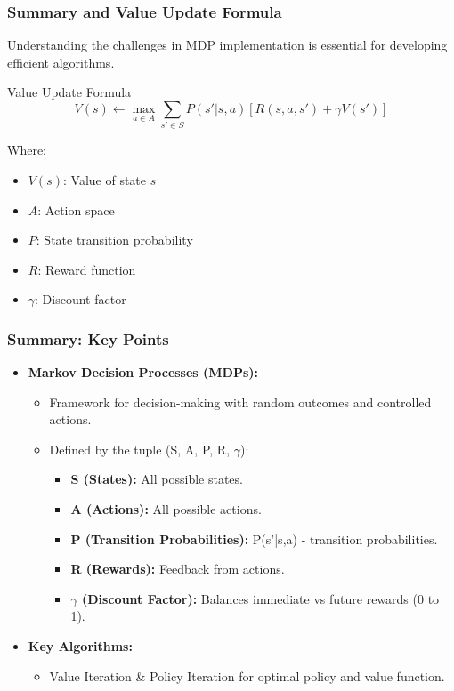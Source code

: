 \documentclass{beamer}
\begin{document}
\begin{frame}[fragile]
    \frametitle{Summary and Value Update Formula}
    Understanding the challenges in MDP implementation is essential for developing efficient algorithms.
    
    \begin{block}{Value Update Formula}
        \begin{equation}
            V(s) \leftarrow \max_{a \in A} \sum_{s' \in S} P(s'|s,a) \left[ R(s,a,s') + \gamma V(s') \right]
        \end{equation}
    \end{block}
    Where:
    \begin{itemize}
        \item \( V(s) \): Value of state \( s \)
        \item \( A \): Action space
        \item \( P \): State transition probability
        \item \( R \): Reward function
        \item \( \gamma \): Discount factor
    \end{itemize}
\end{frame}

\begin{frame}[fragile]
    \frametitle{Summary: Key Points}
    \begin{itemize}
        \item \textbf{Markov Decision Processes (MDPs):}
        \begin{itemize}
            \item Framework for decision-making with random outcomes and controlled actions.
            \item Defined by the tuple (S, A, P, R, $\gamma$):
            \begin{itemize}
                \item \textbf{S (States):} All possible states.
                \item \textbf{A (Actions):} All possible actions.
                \item \textbf{P (Transition Probabilities):} P(s'|s,a) - transition probabilities.
                \item \textbf{R (Rewards):} Feedback from actions.
                \item \textbf{$\gamma$ (Discount Factor):} Balances immediate vs future rewards (0 to 1).
            \end{itemize}
        \end{itemize}
        \item \textbf{Key Algorithms:}
        \begin{itemize}
            \item Value Iteration & Policy Iteration for optimal policy and value function.
        \end{itemize}
    \end{itemize}
\end{frame}
\end{document}

